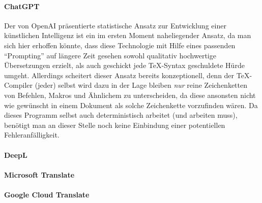 \paragraph*{ChatGPT}\label{par:chatgpt}
Der von OpenAI präsentierte statistische Ansatz zur Entwicklung einer künstlichen Intelligenz ist ein im ersten Moment naheliegender Ansatz, da man sich hier erhoffen könnte, dass diese Technologie mit Hilfe eines passenden \enquote{Prompting} auf längere Zeit gesehen sowohl qualitativ hochwertige Übersetzungen erzielt, als auch geschickt jede \TeX{}-Syntax geschuldete Hürde umgeht. Allerdings scheitert dieser Ansatz%
bereits konzeptionell, denn der \TeX{}-Compiler (jeder) selbst wird dazu in der Lage bleiben \textit{nur} reine Zeichenketten von Befehlen, Makros und Ähnlichem zu unterscheiden, da diese ansonsten nicht wie gewünscht in einem Dokument als solche Zeichenkette vorzufinden wären. Da dieses Programm selbst auch deterministisch arbeitet (und arbeiten muss), benötigt man an dieser Stelle noch keine Einbindung einer potentiellen Fehleranfälligkeit.

\paragraph*{DeepL}\label{par:DeepL}
\paragraph*{Microsoft Translate}\label{par:Microsoft Translate}
\paragraph*{Google Cloud Translate}\label{par:Google Cloud Translate}

